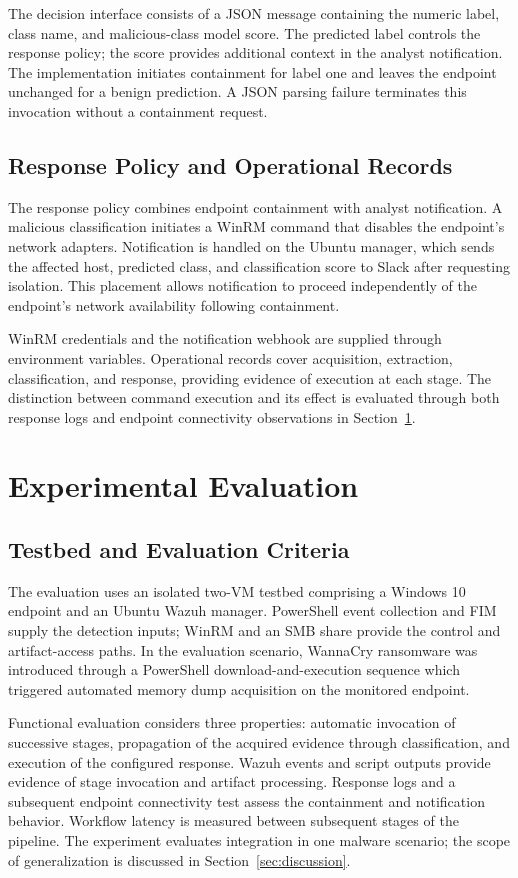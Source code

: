 \documentclass[conference]{IEEEtran}
\begin{document}
The decision interface consists of a JSON message containing the numeric label, class name, and malicious-class model score. The predicted label controls the response policy; the score provides additional context in the analyst notification. The implementation initiates containment for label one and leaves the endpoint unchanged for a benign prediction. A JSON parsing failure terminates this invocation without a containment request.

\subsection{Response Policy and Operational Records}
The response policy combines endpoint containment with analyst notification. A malicious classification initiates a WinRM command that disables the endpoint's network adapters. Notification is handled on the Ubuntu manager, which sends the affected host, predicted class, and classification score to Slack after requesting isolation. This placement allows notification to proceed independently of the endpoint's network availability following containment.

WinRM credentials and the notification webhook are supplied through environment variables. Operational records cover acquisition, extraction, classification, and response, providing evidence of execution at each stage. The distinction between command execution and its effect is evaluated through both response logs and endpoint connectivity observations in Section~\ref{sec:case}.

\section{Experimental Evaluation}
\label{sec:case}

\subsection{Testbed and Evaluation Criteria}
The evaluation uses an isolated two-VM testbed comprising a Windows 10 endpoint and an Ubuntu Wazuh manager. PowerShell event collection and FIM supply the detection inputs; WinRM and an SMB share provide the control and artifact-access paths. In the evaluation scenario, WannaCry ransomware was introduced through a PowerShell download-and-execution sequence which triggered automated memory dump acquisition on the monitored endpoint.

Functional evaluation considers three properties: automatic invocation of successive stages, propagation of the acquired evidence through classification, and execution of the configured response. Wazuh events and script outputs provide evidence of stage invocation and artifact processing. Response logs and a subsequent endpoint connectivity test assess the containment and notification behavior. Workflow latency is measured between subsequent stages of the pipeline.
The experiment evaluates integration in one malware scenario; the scope of generalization is discussed in Section~\ref{sec:discussion}.
\end{document}
